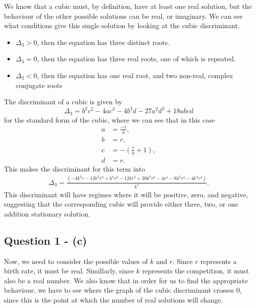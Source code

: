 \documentclass[11pt,a4paper]{article}
\begin{document}
We know that a cubic must, by definition, have at least one real solution, but the behaviour of the other possible solutions can be real, or imaginary. We can see what conditions give this single solution by looking at the cubic discriminant. 
\begin{itemize}
\item $\Delta_3 > 0$, then the equation has three distinct roots.
\item  $\Delta_3 = 0 $, then the equation has three real roots, one of which is repeated. 
\item $\Delta_3 < 0 $, then the equation has one real root, and two non-real, complex conjugate roots
\end{itemize}
The discriminant of a cubic is given by 
$$ \Delta_3 = b^2 c^2 - 4 a c^3 - 4 b^3 d - 27 a^2 d^2 + 18 a b c d $$
for the standard form of the cubic, where we can see that in this case 
\begin{align*}
a &= \frac{-r}{k} ,\\
b &= r ,\\
c &= - \left( \frac{r}{k} + 1 \right), \\
d &= r.
\end{align*}
This makes the discriminant for this term into 
\begin{align*}
\Delta_3 = \frac{(-4 k^3 r - 12 k^2 r^2 + k^4 r^2 - 12 k r^3 + 20 k^3 r^3 - 4 r^4 - 
 8 k^2 r^4 - 4 k^4 r^4)}{k^4}. 
\end{align*}
This discriminant will have regimes where it will be positive, zero, and negative, suggesting that the corresponding cubic will provide either three, two, or one addition stationary solution.

\subsection{Question 1 - (c)}
\label{sec:question1:subsec:partc}
Now, we need to consider the possible values of $k$ and $r$. Since $r$ represents a birth rate, it must be real. Simillarly, since $k$ represents the competition, it must also be a real number. We also know that in  order for us to find the appropriate behaviour, we have to see where the graph of the cubic discriminant crosses $0$, since this is the point at which the number of real solutions will change. 
\end{document}
